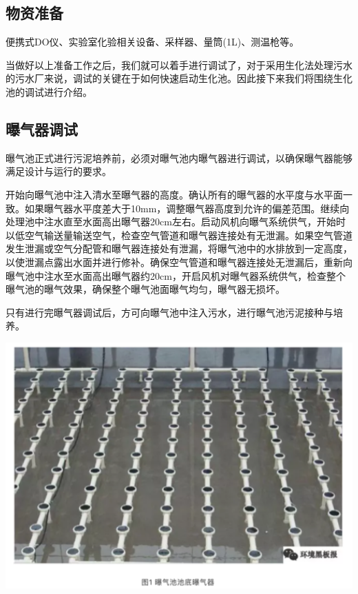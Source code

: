 \documentclass[]{book}
\begin{document}
\hypertarget{ux7269ux8d44ux51c6ux5907}{%
\subsection{物资准备}\label{ux7269ux8d44ux51c6ux5907}}

便携式DO仪、实验室化验相关设备、采样器、量筒(1L)、测温枪等。

当做好以上准备工作之后，我们就可以着手进行调试了，对于采用生化法处理污水的污水厂来说，调试的关键在于如何快速启动生化池。因此接下来我们将围绕生化池的调试进行介绍。

\hypertarget{ux66ddux6c14ux5668ux8c03ux8bd5}{%
\subsection{曝气器调试}\label{ux66ddux6c14ux5668ux8c03ux8bd5}}

曝气池正式进行污泥培养前，必须对曝气池内曝气器进行调试，以确保曝气器能够满足设计与运行的要求。

开始向曝气池中注入清水至曝气器的高度。确认所有的曝气器的水平度与水平面一致。如果曝气器水平度差大于10mm，调整曝气器高度到允许的偏差范围。继续向处理池中注水直至水面高出曝气器20cm左右。启动风机向曝气系统供气，开始时以低空气输送量输送空气，检查空气管道和曝气器连接处有无泄漏。如果空气管道发生泄漏或空气分配管和曝气器连接处有泄漏，将曝气池中的水排放到一定高度，以使泄漏点露出水面并进行修补。确保空气管道和曝气器连接处无泄漏后，重新向曝气池中注水至水面高出曝气器约20cm，开启风机对曝气器系统供气，检查整个曝气池的曝气效果，确保整个曝气池面曝气均匀，曝气器无损坏。

只有进行完曝气器调试后，方可向曝气池中注入污水，进行曝气池污泥接种与培养。

\includegraphics[width=6.67in]{images/ao1}
\end{document}
